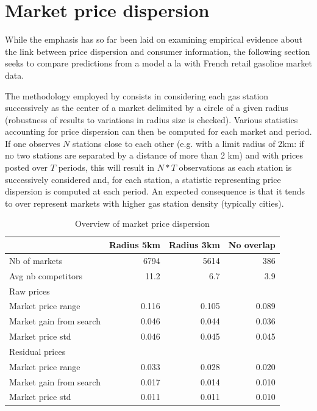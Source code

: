 \documentclass[11pt]{article}
\begin{document}
\section{Market price dispersion}

While the emphasis has so far been laid on examining empirical evidence about the link between price dispersion and consumer information, the following section seeks to compare predictions from a model a la \cite{VAR80} with French retail gasoline market data.

The methodology employed by \cite{TAP11} consists in considering each gas station successively as the center of a market delimited by a circle of a given radius (robustness of results to variations in radius size is checked). Various statistics accounting for price dispersion can then be computed for each market and period. If one observes $N$ stations close to each other (e.g. with a limit radius of 2km: if no two stations are separated by a distance of more than 2 km) and with prices posted over $T$ periods, this will result in $N*T$ observations as each station is successively considered and, for each station, a statistic representing price dispersion is computed at each period. An expected consequence is that it tends to over represent markets with higher gas station density (typically cities).

\begin{table}[h]
\caption{Overview of market price dispersion}
\begin{tabular}{lrrr}
\hline
{} & Radius 5km & Radius 3km & No overlap\\
\hline
Nb of markets & 6794 & 5614 & 386 \\
Avg nb competitors & 11.2 & 6.7 & 3.9 \\
\hline
Raw prices & & & \\
\hline
Market price range & 0.116 & 0.105 & 0.089\\
Market gain from search & 0.046 & 0.044 & 0.036 \\
Market price std & 0.046 & 0.045 & 0.045 \\
\hline
Residual prices & & & \\
\hline
Market price range & 0.033  & 0.028 & 0.020 \\
Market gain from search & 0.017 & 0.014 & 0.010 \\
Market price std & 0.011 & 0.011 & 0.010 \\
\hline
\end{tabular}
\end{table}
\end{document}

